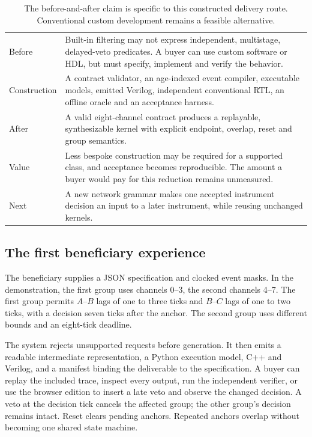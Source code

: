 \begin{table}[htbp]
\centering\small
\begin{tabular}{L{0.13\textwidth}L{0.80\textwidth}}
\toprule
Before & Built-in filtering may not express independent, multistage, delayed-veto predicates. A buyer can use custom software or HDL, but must specify, implement and verify the behavior.\\
Construction & A contract validator, an age-indexed event compiler, executable models, emitted Verilog, independent conventional RTL, an offline oracle and an acceptance harness.\\
After & A valid eight-channel contract produces a replayable, synthesizable kernel with explicit endpoint, overlap, reset and group semantics.\\
Value & Less bespoke construction may be required for a supported class, and acceptance becomes reproducible. The amount a buyer would pay for this reduction remains unmeasured.\\
Next & A new network grammar makes one accepted instrument decision an input to a later instrument, while reusing unchanged kernels.\\
\bottomrule
\end{tabular}
\caption{The before-and-after claim is specific to this constructed delivery route. Conventional custom development remains a feasible alternative.}
\end{table}

\subsection{The first beneficiary experience}
The beneficiary supplies a JSON specification and clocked event masks. In the demonstration, the first group uses channels 0--3, the second channels 4--7. The first group permits $A$--$B$ lags of one to three ticks and $B$--$C$ lags of one to two ticks, with a decision seven ticks after the anchor. The second group uses different bounds and an eight-tick deadline.

The system rejects unsupported requests before generation. It then emits a readable intermediate representation, a Python execution model, C++ and Verilog, and a manifest binding the deliverable to the specification. A buyer can replay the included trace, inspect every output, run the independent verifier, or use the browser edition to insert a late veto and observe the changed decision. A veto at the decision tick cancels the affected group; the other group's decision remains intact. Reset clears pending anchors. Repeated anchors overlap without becoming one shared state machine.

